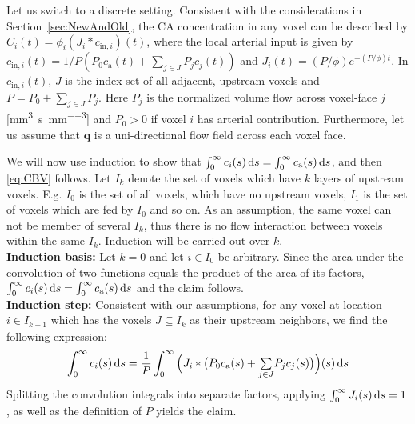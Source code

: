 \documentclass[aps,prb,article,groupedaddress,showkeys]{revtex4}
\begin{document}
	Let us switch to a discrete setting.
	Consistent with the considerations in Section~\ref{sec:NewAndOld}, the CA concentration in any voxel can be described by $C_i(t) = \phi_i(J_i\ast c_{\mathrm{in},i})(t)$, where the local arterial input is given by
		$c_{\mathrm{in},i}(t) =1/P(P_0 c_\mathrm{a}(t) + \sum_{j \in J} P_jc_j(t))$ and $J_i(t)=(P/\phi)e^{- (P/\phi)t}$.
	In $c_{\mathrm{in},i}(t)$, $J$ is the index set of all adjacent, upstream voxels and $P=P_0 + \sum_{j\in J} P_j$.
	Here $P_j$ is the normalized volume flow across voxel-face $j$ [\si{\milli\meter\cubed\per\second\per\milli\meter\cubed}] and $P_0>0$ if voxel $i$ has arterial contribution.
	Furthermore, let us assume that $\mathbf{q}$ is a uni-directional flow field across each voxel face.
	
		We will now use induction to show that $\int_0^\infty c_i(s) \,\mathrm{d} s = \int_0^\infty c_\mathrm{a}(s) \,\mathrm{d} s$, and then \eqref{eq:CBV} follows.
		Let $I_k$ denote the set of voxels which have $k$ layers of upstream voxels.
		E.g. $I_0$ is the set of all voxels, which have no upstream voxels, $I_1$ is the set of voxels which are fed by $I_0$ and so on. As an assumption, the same voxel can not be member of several $I_k$, thus there is no flow interaction between voxels within the same $I_k$.
		Induction will be carried out over $k$.\\
		\textbf{Induction basis:}
		Let $k=0$ and let $i \in I_0$ be arbitrary.
		Since the area under the convolution of two functions equals the product of the area of its factors, $\int_0^\infty c_i(s) \,\mathrm{d} s = \int_0^\infty c_\mathrm{a}(s) \,\mathrm{d} s$ and the claim follows.\\
		\textbf{Induction step:}
		Consistent with our assumptions, for any voxel at location $i \in I_{k+1}$ which has the voxels $J \subseteq I_{k}$ as their upstream neighbors, we find the following expression:
		\begin{equation}
			\int_0^\infty c_i(s) \,\mathrm{d} s = \frac{1}{P}\int_0^\infty \Big(J_i\ast \big( P_0 c_\mathrm{a}(s) + {\textstyle\sum\limits_{j \in J}}P_j c_j(s) \big)\Big)(s) \,\mathrm{d} s
		\end{equation}
		 Splitting the convolution integrals into separate factors, applying $\int_0^{\infty}J_i(s)\,\mathrm{d} s = 1$, as well as the definition of $P$ yields the claim.
	
\end{document}
